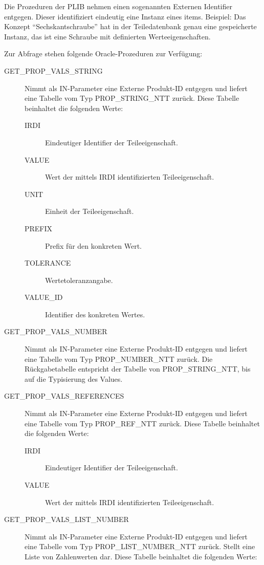 Die Prozeduren der PLIB nehmen einen sogenannten Externen Identifier entgegen. Dieser identifiziert eindeutig eine Instanz eines \glspl{item}. 
Beispiel: 
Das Konzept \enquote{Sechskantschraube} hat in der Teiledatenbank genau eine gespeicherte Instanz, das ist eine Schraube mit definierten Werteeigenschaften. 

Zur Abfrage stehen folgende Oracle-Prozeduren zur Verfügung:

\begin{description}
\item[GET\_PROP\_VALS\_STRING] Nimmt als IN-Parameter eine Externe Produkt-ID entgegen und liefert eine Tabelle vom Typ PROP\_STRING\_NTT zurück. 
Diese Tabelle beinhaltet die folgenden Werte: 
  \begin{description}
  \item[IRDI] Eindeutiger Identifier der Teileeigenschaft.
  \item[VALUE] Wert der mittels IRDI identifizierten Teileeigenschaft.
  \item[UNIT] Einheit der Teileeigenschaft.
  \item[PREFIX] Prefix für den konkreten Wert.
  \item[TOLERANCE] Wertetoleranzangabe.
  \item[VALUE\_ID] Identifier des konkreten Wertes.
  \end{description}

\item[GET\_PROP\_VALS\_NUMBER]  Nimmt als IN-Parameter eine Externe Produkt-ID entgegen und liefert eine Tabelle vom Typ PROP\_NUMBER\_NTT zurück. 
Die Rückgabetabelle entspricht der Tabelle von PROP\_STRING\_NTT, bis auf die Typisierung des Values. 
\item[GET\_PROP\_VALS\_REFERENCES]  Nimmt als IN-Parameter eine Externe Produkt-ID entgegen und liefert eine Tabelle vom Typ PROP\_REF\_NTT zurück. 
Diese Tabelle beinhaltet die folgenden Werte: 
  \begin{description}
  \item[IRDI] Eindeutiger Identifier der Teileeigenschaft.
  \item[VALUE] Wert der mittels IRDI identifizierten Teileeigenschaft.
  \end{description}
\item[GET\_PROP\_VALS\_LIST\_NUMBER] Nimmt als IN-Parameter eine Externe Produkt-ID entgegen und liefert eine Tabelle vom Typ PROP\_LIST\_NUMBER\_NTT zurück. Stellt eine Liste von Zahlenwerten dar. 
Diese Tabelle beinhaltet die folgenden Werte: 


\end{description}

